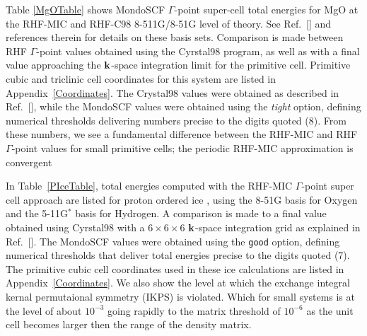 \documentclass[prb,aps,nobibnotes,twocolumn,doublespace,twocolumngrid,superbib]{revtex4}
\begin{document}
Table \ref{MgOTable} shows {\sc MondoSCF} $\Gamma$-point super-cell total energies for MgO 
at the RHF-MIC and RHF-C98 8-511G/8-51G level of theory.  See Ref.~[] and 
references therein for details on these basis sets.  Comparison is made between RHF
$\Gamma$-point values obtained using the {\sc Cyrstal98} program, as well as with a final value 
approaching the ${\bf k}$-space integration limit for the primitive cell. 
Primitive cubic and triclinic cell coordinates for this system are listed in Appendix~\ref{Coordinates}.
The {\sc Crystal98} values were obtained as described in Ref.~[], while the 
{\sc MondoSCF} values were obtained using the {\it tight} option, defining numerical thresholds 
delivering numbers precise to the digits quoted (8).  From these numbers, we see a fundamental 
difference between the RHF-MIC and RHF $\Gamma$-point values for small primitive cells; 
the periodic RHF-MIC approximation is convergent 


In Table~\ref{PIceTable}, total energies computed with the RHF-MIC $\Gamma$-point
super cell approach are listed for proton ordered ice \cite{}, using the 8-51G basis 
for Oxygen and the 5-11G$^*$ basis for Hydrogen.  A comparison is made to a final 
value obtained using {\sc Cyrstal98} with a $6\times6\times6$ ${\bf k}$-space integration grid
as explained in Ref.~[].  The {\sc MondoSCF} values were obtained 
using the {\tt good} option, defining numerical thresholds that deliver total energies
precise to the digits quoted (7).  The primitive cubic cell coordinates used in these
ice calculations are listed in Appendix~\ref{Coordinates}. We also show the level at which
the exchange integral kernal permutaional symmetry (IKPS) is violated. Which for small systems is at the
level of about $10^{-3}$ going rapidly to the matrix threshold of $10^{-6}$ as the unit cell becomes 
larger then the range of the density matrix.
\end{document}
